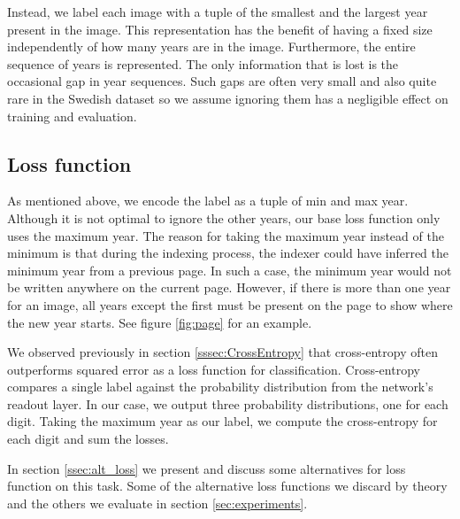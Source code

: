 Instead, we label each image with a tuple of the smallest and the largest year present in the image. This representation has the benefit of having a fixed size independently of how many years are in the image. Furthermore, the entire sequence of years is represented. The only information that is lost is the occasional gap in year sequences. Such gaps are often very small and also quite rare in the Swedish dataset so we assume ignoring them has a negligible effect on training and evaluation.




\subsection{Loss function} \label{ssec:method_loss}

As mentioned above, we encode the label as a tuple of min and max year. Although it is not optimal to ignore the other years, our base loss function  only uses the maximum year.
The reason for taking the maximum year instead of the minimum is that during the indexing process, the indexer could have inferred the minimum year from a previous page. In such a case, the minimum year would not be written anywhere on the current page. However, if there is more than one year for an image, all years except the first must be present on the page to show where the new year starts. See figure \ref{fig:page} for an example.

We observed previously in section \ref{sssec:CrossEntropy} that cross-entropy often outperforms squared error as a loss function for classification. Cross-entropy compares a single label against the probability distribution from the network's readout layer. In our case, we output three probability distributions, one for each digit.
Taking the maximum year as our label, we compute
the cross-entropy for each digit and sum the losses.

In section \ref{ssec:alt_loss} we present and discuss some alternatives for loss function on this task. Some of the alternative loss functions we discard by theory and the others we evaluate in section \ref{sec:experiments}.

